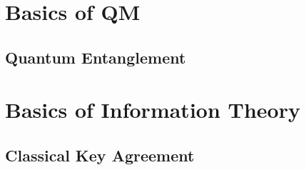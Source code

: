
\lipsum[3]
	\section{Basics of QM}
	\lipsum[7]
	\cite{QC10th}
		\subsection{Quantum Entanglement}
		\lipsum[4]
		\cite{4H07}
	\section{Basics of Information Theory}
	\lipsum[3]
		\subsection{Classical Key Agreement}
		\lipsum[3]